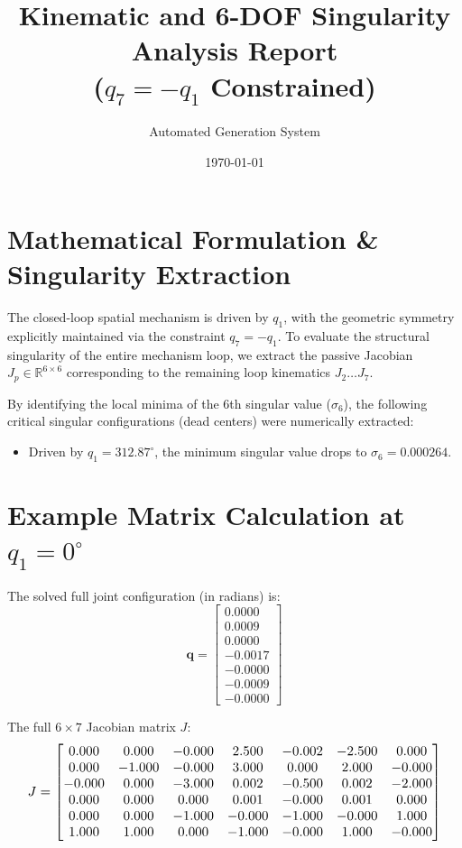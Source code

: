 \documentclass[12pt,a4paper]{article}
\title{\textbf{Kinematic and 6-DOF Singularity Analysis Report \\ ($q_7 = -q_1$ Constrained)}}
\author{Automated Generation System}
\date{\today}
\begin{document}
\maketitle

\section{Mathematical Formulation \& Singularity Extraction}
The closed-loop spatial mechanism is driven by $q_1$, with the geometric symmetry explicitly maintained via the constraint $q_7 = -q_1$. To evaluate the structural singularity of the entire mechanism loop, we extract the passive Jacobian $J_p \in \mathbb{R}^{6 \times 6}$ corresponding to the remaining loop kinematics $J_2 \dots J_7$. 

By identifying the local minima of the 6th singular value ($\sigma_6$), the following critical singular configurations (dead centers) were numerically extracted:
\begin{itemize}
    \item Driven by $q_1 = 312.87^\circ$, the minimum singular value drops to $\sigma_6 = 0.000264$.
\end{itemize}

\section{Example Matrix Calculation at $q_1 = 0^\circ$}
The solved full joint configuration (in radians) is:
\begin{equation}
    \mathbf{q} = \begin{bmatrix} 0.0000 \\ 0.0009 \\ 0.0000 \\ -0.0017 \\ -0.0000 \\ -0.0009 \\ -0.0000 \end{bmatrix}
\end{equation}

The full $6 \times 7$ Jacobian matrix $J$:
\begin{equation}
    \resizebox{0.95\textwidth}{!}{$ J = \begin{bmatrix}
  0.000 & 0.000 & -0.000 & 2.500 & -0.002 & -2.500 & 0.000 \\
  0.000 & -1.000 & -0.000 & 3.000 & 0.000 & 2.000 & -0.000 \\
  -0.000 & 0.000 & -3.000 & 0.002 & -0.500 & 0.002 & -2.000 \\
  0.000 & 0.000 & 0.000 & 0.001 & -0.000 & 0.001 & 0.000 \\
  0.000 & 0.000 & -1.000 & -0.000 & -1.000 & -0.000 & 1.000 \\
  1.000 & 1.000 & 0.000 & -1.000 & -0.000 & 1.000 & -0.000
\end{bmatrix} $}
\end{equation}
\end{document}

